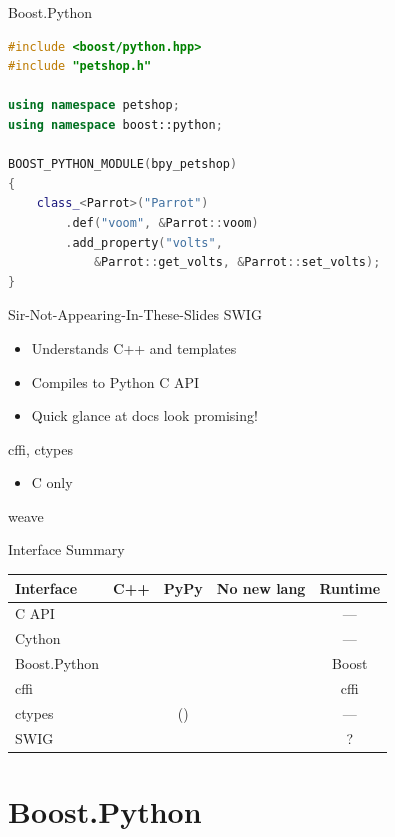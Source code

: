 \documentclass{beamer}
\begin{document}
\begin{frame}[fragile]{Boost.Python}
  \pause
  \begin{lstlisting}[language=c++]
#include <boost/python.hpp>
#include "petshop.h"

using namespace petshop;
using namespace boost::python;

BOOST_PYTHON_MODULE(bpy_petshop)
{
    class_<Parrot>("Parrot")
        .def("voom", &Parrot::voom)
        .add_property("volts",
            &Parrot::get_volts, &Parrot::set_volts);
}
  \end{lstlisting}
\end{frame}

\begin{frame}{Sir-Not-Appearing-In-These-Slides}
  SWIG
  \begin{itemize}
    \item Understands C++ and templates
    \item Compiles to Python C API
    \item Quick glance at docs look promising!
  \end{itemize}
  cffi, ctypes
  \begin{itemize}
    \item C only
  \end{itemize}
  weave
\end{frame}

\begin{frame}{Interface Summary}
  \def\yes{\textcolor{green!50!black}{\CheckmarkBold}}
  \def\no{\textcolor{red}{\XSolidBrush}}
  \begin{table}
    \begin{tabular}{lcccc}
      \toprule
      Interface & C++ & PyPy & No new lang & Runtime\\
      \midrule
      C API & \no & \no & \yes & ---\\
      Cython & \yes & \no & \no & ---\\
      Boost.Python & \yes & \no & \yes & Boost\\
      cffi  & \no & \yes & \yes & cffi\\
      ctypes & \no & (\yes) & \yes & ---\\
      SWIG & \yes & \no & \no & ?\\
      \bottomrule
    \end{tabular}
  \end{table}
\end{frame}

\section{Boost.Python}
\end{document}
